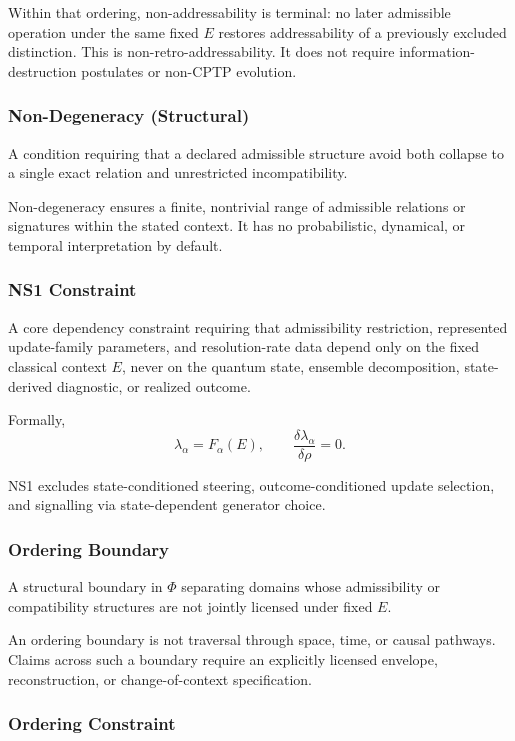 \documentclass[aps,prx,onecolumn,11pt]{revtex4-2}
\theoremstyle{plain}
\theoremstyle{definition}
\theoremstyle{remark}
\begin{document}
Within that ordering, non-addressability is terminal: no later
admissible operation under the same fixed \(E\) restores addressability
of a previously excluded distinction. This is non-retro-addressability.
It does not require information-destruction postulates or non-CPTP
evolution.

\subsubsection*{Non-Degeneracy (Structural)}

A condition requiring that a declared admissible structure avoid both
collapse to a single exact relation and unrestricted incompatibility.

Non-degeneracy ensures a finite, nontrivial range of admissible
relations or signatures within the stated context. It has no
probabilistic, dynamical, or temporal interpretation by default.

\subsubsection*{NS1 Constraint}

A core dependency constraint requiring that admissibility restriction,
represented update-family parameters, and resolution-rate data depend
only on the fixed classical context \(E\), never on the quantum state,
ensemble decomposition, state-derived diagnostic, or realized outcome.

Formally,
\[
\lambda_\alpha=F_\alpha(E),
\qquad
\frac{\delta\lambda_\alpha}{\delta\rho}=0.
\]

NS1 excludes state-conditioned steering, outcome-conditioned update
selection, and signalling via state-dependent generator choice.

\subsubsection*{Ordering Boundary}

A structural boundary in \(\Phi\) separating domains whose
admissibility or compatibility structures are not jointly licensed
under fixed \(E\).

An ordering boundary is not traversal through space, time, or causal
pathways. Claims across such a boundary require an explicitly licensed
envelope, reconstruction, or change-of-context specification.

\subsubsection*{Ordering Constraint}
\end{document}
